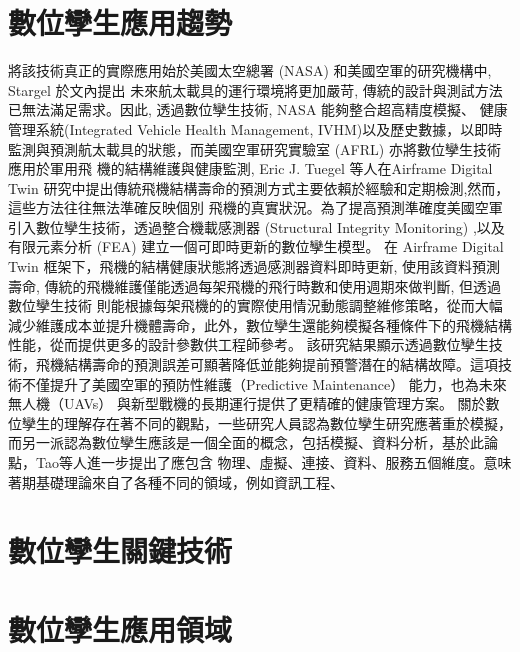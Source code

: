 \section{數位孿生應用趨勢}
將該技術真正的實際應用始於美國太空總署 (NASA) 和美國空軍的研究機構中, Stargel \cite{Glaessgen2012DigitalTwin}於文內提出
未來航太載具的運行環境將更加嚴苛, 傳統的設計與測試方法已無法滿足需求。因此, 透過數位孿生技術, NASA 能夠整合超高精度模擬、
健康管理系統(Integrated Vehicle Health Management, IVHM)以及歷史數據，以即時監測與預測航太載具的狀態，而美國空軍研究實驗室 (AFRL) 亦將數位孿生技術應用於軍用飛
機的結構維護與健康監測, Eric J. Tuegel 等人在Airframe Digital Twin 研究中提出傳統飛機結構壽命的預測方式主要依賴於經驗和定期檢測,然而，這些方法往往無法準確反映個別
飛機的真實狀況。為了提高預測準確度美國空軍引入數位孿生技術，透過整合機載感測器 (Structural Integrity Monitoring) ,以及有限元素分析 (FEA) 建立一個可即時更新的數位孿生模型。
在 Airframe Digital Twin 框架下，飛機的結構健康狀態將透過感測器資料即時更新, 使用該資料預測壽命, 傳統的飛機維護僅能透過每架飛機的飛行時數和使用週期來做判斷, 但透過數位孿生技術
則能根據每架飛機的的實際使用情況動態調整維修策略，從而大幅減少維護成本並提升機體壽命，此外，數位孿生還能夠模擬各種條件下的飛機結構性能，從而提供更多的設計參數供工程師參考。
該研究結果顯示透過數位孿生技術，飛機結構壽命的預測誤差可顯著降低並能夠提前預警潛在的結構故障。這項技術不僅提升了美國空軍的預防性維護（Predictive Maintenance） 能力，也為未來無人機（UAVs）
與新型戰機的長期運行提供了更精確的健康管理方案。
關於數位孿生的理解存在著不同的觀點，一些研究人員認為數位孿生研究應著重於模擬，而另一派認為數位孿生應該是一個全面的概念，包括模擬、資料分析，基於此論點，Tao等人進一步提出了應包含
物理、虛擬、連接、資料、服務五個維度。意味著期基礎理論來自了各種不同的領域，例如資訊工程、
\section{數位孿生關鍵技術}
\section{數位孿生應用領域}
